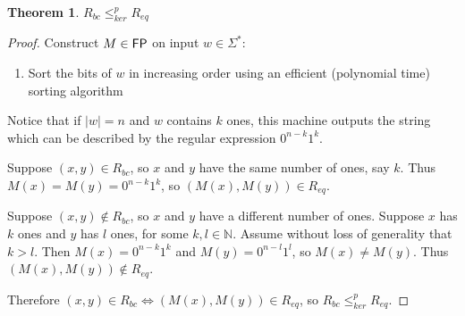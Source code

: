 \documentclass{article}
\newtheorem{theorem}{Theorem}[section]
\theoremstyle{definition}
\newcommand{\sigmastar}{\Sigma^{*}}
\newcommand{\kr}{\leq^{p}_{ker}} %
\begin{document}
\begin{theorem}$R_{bc}\kr R_{eq}$\end{theorem}
\begin{proof}
  Construct $M\in {\ensuremath{\mathsf{FP}}}$ on input $w\in\sigmastar$:
  \begin{enumerate}
  \item Sort the bits of $w$ in increasing order using an efficient (polynomial
    time) sorting algorithm
  \end{enumerate}
  Notice that if $|w|=n$ and $w$ contains $k$ ones, this machine outputs
  the string which can be described by the regular expression $0^{n-k}1^k$.

  Suppose $(x, y)\in R_{bc}$, so $x$ and $y$ have the same number of ones, say
  $k$. Thus $M(x)=M(y)=0^{n-k}1^k$, so $(M(x), M(y))\in R_{eq}$.
  
  Suppose $(x, y)\notin R_{bc}$, so $x$ and $y$ have a different number of
  ones. Suppose $x$ has $k$ ones and $y$ has $l$ ones, for some
  $k,l\in\mathbb{N}$. Assume without loss of generality that $k>l$. Then
  $M(x)=0^{n-k}1^{k}$ and $M(y)=0^{n-l}1^{l}$, so $M(x)\neq M(y)$. Thus
  $(M(x), M(y))\notin R_{eq}$.

  Therefore $(x, y)\in R_{bc} \iff (M(x), M(y))\in R_{eq}$, so $R_{bc}\kr
  R_{eq}$.
\end{proof}
\end{document}
